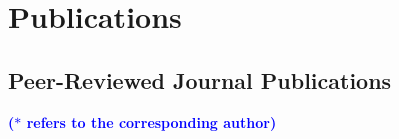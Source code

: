 \documentclass[12pt]{article}
\begin{document}
	
	\section*{Publications}
	\subsection*{Peer-Reviewed Journal Publications}
	
	{\bf \textcolor{blue}{($\ast$ refers to the corresponding author)}}
	
	\noindent {\bf \textcolor{brown}{($\dagger$ refers to my 
	students, postdocs or trainees)}}
	
\end{document}
